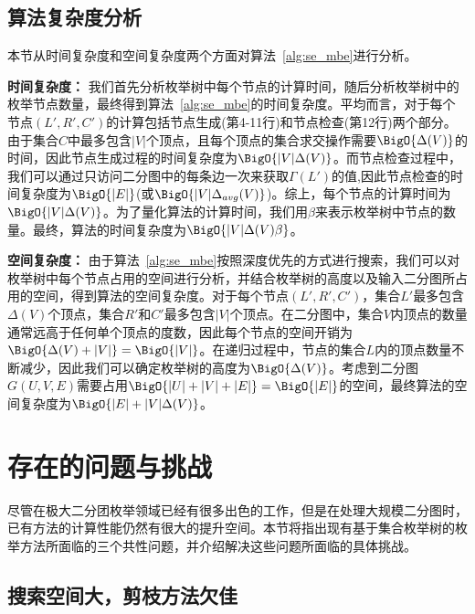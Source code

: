 \subsection{算法复杂度分析}
\label{subsec:baseline_analysis}

本节从时间复杂度和空间复杂度两个方面对算法~\ref{alg:se_mbe}进行分析。

\textbf{时间复杂度：} 我们首先分析枚举树中每个节点的计算时间，随后分析枚举树中的枚举节点数量，最终得到算法~\ref{alg:se_mbe}的时间复杂度。平均而言，对于每个节点$(L',R',C')$的计算包括节点生成(第4-11行)和节点检查(第12行)两个部分。由于集合$C$中最多包含$|V|$个顶点，且每个顶点的集合求交操作需要$\BigO{\Delta(V)}$的时间，因此节点生成过程的时间复杂度为$\BigO{|V|\Delta(V)}$。而节点检查过程中，我们可以通过只访问二分图中的每条边一次来获取$\Gamma(L')$的值,因此节点检查的时间复杂度为$\BigO{|E|}$(或$\BigO{|V|\Delta_{avg}(V)}$)。综上，每个节点的计算时间为$\BigO{|V|\Delta(V)}$。为了量化算法的计算时间，我们用$\beta$来表示枚举树中节点的数量。最终，算法的时间复杂度为$\BigO{|V|\Delta(V)\beta}$。

\textbf{空间复杂度：} 由于算法~\ref{alg:se_mbe}按照深度优先的方式进行搜索，我们可以对枚举树中每个节点占用的空间进行分析，并结合枚举树的高度以及输入二分图所占用的空间，得到算法的空间复杂度。对于每个节点$(L',R',C')$，集合$L'$最多包含$\Delta(V)$个顶点，集合$R'$和$C'$最多包含$|V|$个顶点。在二分图中，集合$V$内顶点的数量通常远高于任何单个顶点的度数，因此每个节点的空间开销为$\BigO{\Delta(V)+|V|}=\BigO{|V|}$。在递归过程中，节点的集合$L$内的顶点数量不断减少，因此我们可以确定枚举树的高度为$\BigO{\Delta(V)}$。考虑到二分图$G(U,V,E)$需要占用$\BigO{|U|+|V|+|E|}=\BigO{|E|}$的空间，最终算法的空间复杂度为$\BigO{|E|+|V|\Delta(V)}$。

\section{存在的问题与挑战}

尽管在极大二分团枚举领域已经有很多出色的工作，但是在处理大规模二分图时，已有方法的计算性能仍然有很大的提升空间。本节将指出现有基于集合枚举树的枚举方法所面临的三个共性问题，并介绍解决这些问题所面临的具体挑战。

\subsection{搜索空间大，剪枝方法欠佳}


